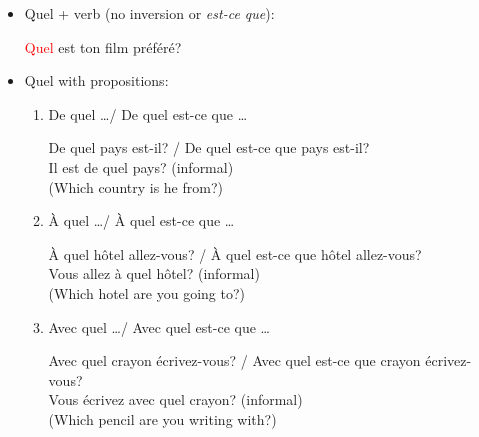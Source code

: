 \documentclass{book}
\begin{document}
\begin{itemize}
\begin{itemize}
                    \item Quel + verb (no inversion or \textit{est-ce que}):
                        \begin{center}
                            \textcolor{red}{Quel} est ton film préféré?
                        \end{center}

                    \item Quel with propositions:
                        \begin{enumerate}
                            \item De quel \dots / De quel est-ce que \dots
                                \begin{center}
                                    De quel pays est-il? / De quel est-ce que pays est-il? \\
                                    Il est de quel pays? (informal) \\
                                    (Which country is he from?)
                                \end{center}

                            \item À quel \dots / À quel est-ce que \dots
                                \begin{center}
                                    À quel hôtel allez-vous? / À quel est-ce que hôtel allez-vous? \\
                                    Vous allez à quel hôtel? (informal) \\
                                    (Which hotel are you going to?)
                                \end{center}

                            \item Avec quel \dots / Avec quel est-ce que \dots
                                \begin{center}
                                    Avec quel crayon écrivez-vous? / Avec quel est-ce que crayon écrivez-vous? \\
                                    Vous écrivez avec quel crayon? (informal) \\
                                    (Which pencil are you writing with?)
                                \end{center}
                        \end{enumerate}


\end{itemize}
\end{itemize}
\end{document}
